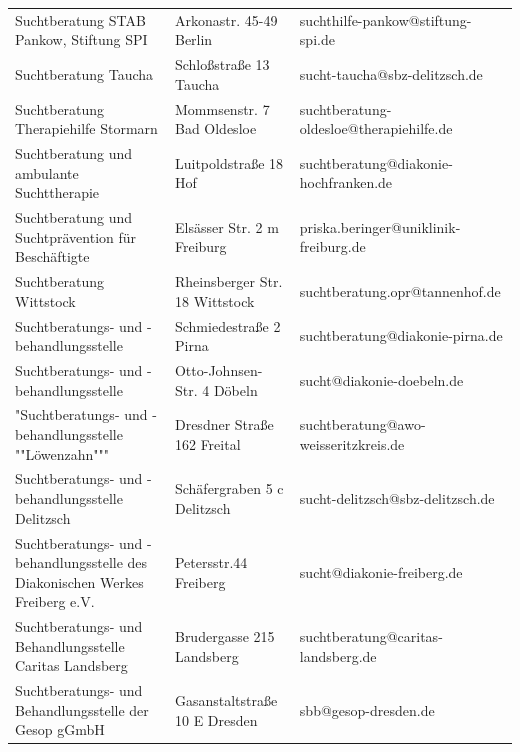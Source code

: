{\begin{xltabular}{\textwidth} {
 >{\raggedright\arraybackslash}p{5cm}
 >{\raggedright\arraybackslash}X
 >{\raggedright\arraybackslash}p{5cm} }
Suchtberatung STAB Pankow, Stiftung SPI & Arkonastr. 45-49 Berlin & suchthilfe-pankow@stiftung-spi.de \\
Suchtberatung Taucha & Schloßstraße 13 Taucha & sucht-taucha@sbz-delitzsch.de \\
Suchtberatung Therapiehilfe Stormarn & Mommsenstr. 7 Bad Oldesloe & suchtberatung-oldesloe@therapiehilfe.de \\
Suchtberatung und ambulante Suchttherapie & Luitpoldstraße 18 Hof & suchtberatung@diakonie-hochfranken.de \\
Suchtberatung und Suchtprävention für Beschäftigte & Elsässer Str. 2 m Freiburg & priska.beringer@uniklinik-freiburg.de \\
Suchtberatung Wittstock & Rheinsberger Str. 18 Wittstock & suchtberatung.opr@tannenhof.de \\
Suchtberatungs- und -behandlungsstelle & Schmiedestraße 2 Pirna & suchtberatung@diakonie-pirna.de \\
Suchtberatungs- und -behandlungsstelle & Otto-Johnsen- Str. 4 Döbeln & sucht@diakonie-doebeln.de \\
"Suchtberatungs- und -behandlungsstelle ""Löwenzahn""" & Dresdner Straße 162 Freital & suchtberatung@awo-weisseritzkreis.de \\
Suchtberatungs- und -behandlungsstelle Delitzsch & Schäfergraben 5 c Delitzsch & sucht-delitzsch@sbz-delitzsch.de \\
Suchtberatungs- und -behandlungsstelle des Diakonischen Werkes Freiberg e.V. & Petersstr.44 Freiberg & sucht@diakonie-freiberg.de \\
Suchtberatungs- und Behandlungsstelle Caritas Landsberg & Brudergasse 215 Landsberg & suchtberatung@caritas-landsberg.de \\
Suchtberatungs- und Behandlungsstelle der Gesop gGmbH & Gasanstaltstraße 10 E Dresden & sbb@gesop-dresden.de \\

\end{xltabular}}
